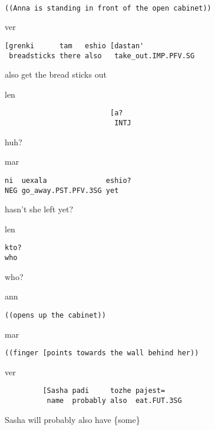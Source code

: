 \documentclass[output=paper,modfonts,nonflat]{langsci/langscibook}
\begin{document}
\vspace{2mm}
%
\begin{transbox}{1}{~}
\begin{verbatim}
((Anna is standing in front of the open cabinet))
\end{verbatim}
\end{transbox}
%
\begin{mdframednoverticalspace}[style=firstfoc]
\begin{transbox}{2}{ver}
\begin{verbatim}
[grenki      tam   eshio [dastan'
 breadsticks there also   take_out.IMP.PFV.SG
\end{verbatim}
\hspace{0.07cm} also get the bread sticks out
\end{transbox}
\end{mdframednoverticalspace}
%
\begin{transbox}{3}{len}%
\begin{verbatim}
                         [a?
                          INTJ
\end{verbatim}
\hspace{3.8cm} huh?
\end{transbox}\vspace{1mm}
%
\begin{transbox}{4}{mar}%
\begin{verbatim}
ni  uexala              eshio?
NEG go_away.PST.PFV.3SG yet
\end{verbatim}
hasn’t she left yet?
\end{transbox}
%
\begin{transbox}{5}{len}%
\begin{verbatim}
kto?
who
\end{verbatim}
who?
\end{transbox}
%
%
\begin{transbox}{7}{ann}%
\begin{verbatim}
((opens up the cabinet))
\end{verbatim}
\end{transbox}
%
\begin{transbox}{8}{mar}%
\begin{verbatim}
((finger [points towards the wall behind her))
\end{verbatim}
\end{transbox}
%
\begin{mdframednoverticalspace}[style=firstfoc]
\begin{transbox}{9}{ver}%
\begin{verbatim}
         [Sasha padi     tozhe pajest=
          name  probably also  eat.FUT.3SG
\end{verbatim}
\hspace{1.4cm} Sasha will probably also have \{some\}
\end{transbox}
\end{mdframednoverticalspace}
\end{document}
